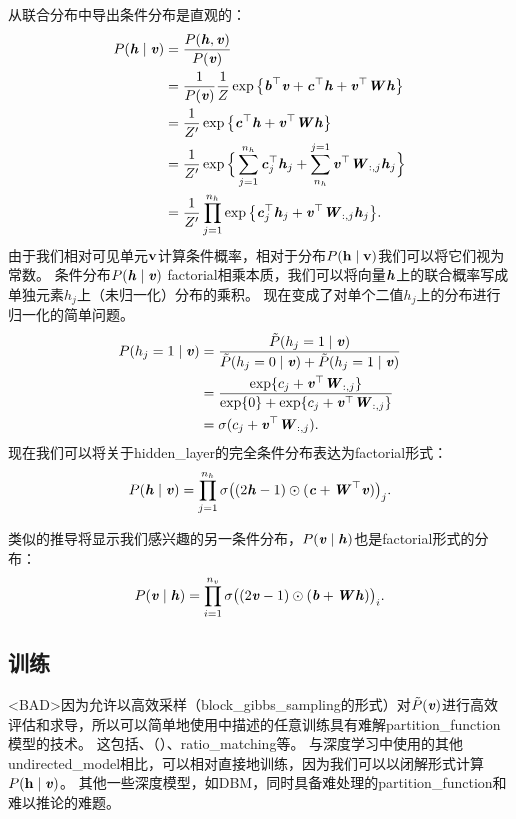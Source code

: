 从联合分布中导出条件分布是直观的：
\begin{align}
 P(\Vh \mid \Vv) &= \frac{P(\Vh, \Vv)}{P(\Vv)} \\
 &= \frac{1}{P(\Vv)} \frac{1}{Z} \exp \big\{ \Vb^\top \Vv + \Vc^\top \Vh + \Vv^\top\MW \Vh \big\} \\
 &=  \frac{1}{Z^\prime} \exp \big\{ \Vc^\top \Vh + \Vv^\top\MW \Vh \big\} \\
 &=  \frac{1}{Z^\prime} \exp \Big\{ \sum_{j=1}^{n_h}\Vc_j^\top \Vh_j 
 + \sum_{n_h}^{j=1} \Vv^\top\MW_{:,j} \Vh_j \Big\} \\
 &=  \frac{1}{Z^\prime} \prod_{j=1}^{n_h} \exp \big\{ \Vc_j^\top \Vh_j + \Vv^\top\MW_{:,j} \Vh_j \big\} .
\end{align}
由于我们相对可见单元$\RVv$计算条件概率，相对于分布$P(\RVh  \mid  \RVv)$我们可以将它们视为常数。
条件分布$ P(\Vh  \mid  \Vv) $ \gls{factorial}相乘本质，我们可以将向量$\Vh$上的联合概率写成单独元素$h_j$上（未归一化）分布的乘积。
现在变成了对单个二值$h_j$上的分布进行归一化的简单问题。
\begin{align}
 P(h_j=1  \mid  \Vv) &= \frac{\tilde{P}(h_j=1 \mid \Vv)}{\tilde{P}(h_j=0 \mid \Vv) + \tilde{P}(h_j=1 \mid \Vv)} \\
 &= \frac{\exp \{ c_j + \Vv^\top \MW_{:,j} \} }{\exp\{ 0 \} + \exp \{ c_j + \Vv^\top \MW_{:,j}\}} \\
 &= \sigma (c_j + \Vv^\top \MW_{:,j}).
\end{align}
现在我们可以将关于\gls{hidden_layer}的完全条件分布表达为\gls{factorial}形式：
\begin{align}
 P(\Vh  \mid  \Vv) = \prod_{j=1}^{n_h} \sigma \big( (2\Vh-1) \odot (\Vc + \MW^\top \Vv) \big)_j .
\end{align}

类似的推导将显示我们感兴趣的另一条件分布，$P(\Vv  \mid  \Vh)$也是\gls{factorial}形式的分布：
\begin{align}
  P(\Vv  \mid  \Vh) = \prod_{i=1}^{n_v} \sigma \big( (2\Vv-1) \odot (\Vb + \MW \Vh) \big)_i .
\end{align}


\subsection{训练}
\label{sec:training_restricted_boltzmann_machines}

<BAD>因为允许以高效采样（\gls{block_gibbs_sampling}的形式）对$\tilde{P}(\Vv)$进行高效评估和求导，所以可以简单地使用中描述的任意训练具有难解\gls{partition_function}模型的技术。
这包括、（）、\gls{ratio_matching}等。
与深度学习中使用的其他\gls{undirected_model}相比，可以相对直接地训练，因为我们可以以闭解形式计算$P(\RVh  \mid  \Vv)$。
其他一些深度模型，如\gls{DBM}，同时具备难处理的\gls{partition_function}和难以推论的难题。

